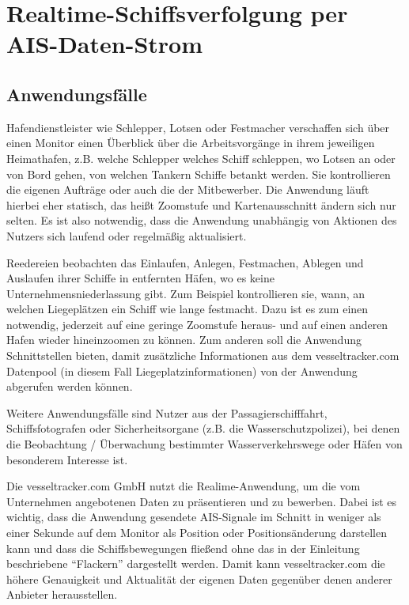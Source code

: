 \chapter{Realtime-Schiffsverfolgung per AIS-Daten-Strom}\label{c.Realtime-Schiffsverfolgung per AIS-Daten-Strom}

\section{ Anwendungsfälle}\label{s.Anwendungsfälle}

Hafendienstleister wie Schlepper, Lotsen oder Festmacher verschaffen sich über einen Monitor einen Überblick über die Arbeitsvorgänge in ihrem jeweiligen Heimathafen, z.B. welche Schlepper welches Schiff schleppen, wo Lotsen an oder von Bord gehen, von welchen Tankern Schiffe betankt werden. Sie kontrollieren die eigenen Aufträge oder auch die der Mitbewerber.
Die Anwendung läuft hierbei eher statisch, das heißt Zoomstufe und Kartenausschnitt ändern sich nur selten. Es ist also notwendig, dass die Anwendung unabhängig von Aktionen des Nutzers sich laufend oder regelmäßig aktualisiert.

Reedereien beobachten das Einlaufen, Anlegen, Festmachen, Ablegen und Auslaufen ihrer Schiffe in entfernten Häfen, wo es keine Unternehmensniederlassung gibt. Zum Beispiel kontrollieren sie, wann, an welchen Liegeplätzen ein Schiff wie lange festmacht.
Dazu ist es zum einen notwendig, jederzeit auf eine geringe Zoomstufe heraus- und auf einen anderen Hafen wieder hineinzoomen zu können. Zum anderen soll die Anwendung Schnittstellen bieten, damit zusätzliche Informationen aus dem vesseltracker.com Datenpool (in diesem Fall Liegeplatzinformationen) von der Anwendung abgerufen werden können.

Weitere Anwendungsfälle sind Nutzer aus der Passagierschifffahrt, Schiffsfotografen oder Sicherheitsorgane (z.B. die Wasserschutzpolizei), bei denen die Beobachtung / Überwachung bestimmter Wasserverkehrswege oder Häfen von besonderem Interesse ist.

Die vesseltracker.com GmbH nutzt die Realime-Anwendung, um die vom Unternehmen angebotenen Daten zu präsentieren und zu bewerben. Dabei ist es wichtig, dass die Anwendung gesendete AIS-Signale im Schnitt in weniger als einer Sekunde auf dem Monitor als Position oder Positionsänderung darstellen kann und dass die Schiffsbewegungen fließend ohne das in der Einleitung beschriebene “Flackern” dargestellt werden. Damit kann vesseltracker.com die höhere Genauigkeit und Aktualität der eigenen Daten gegenüber denen anderer Anbieter herausstellen.

